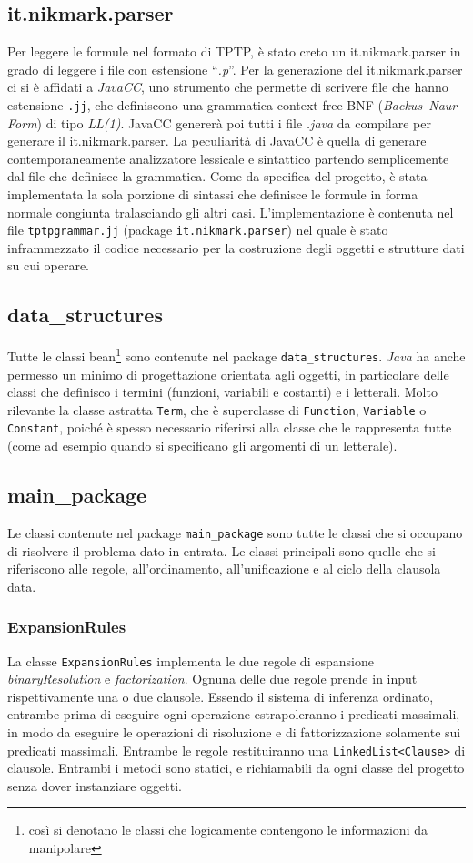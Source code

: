 \documentclass[a4paper,11pt]{article}
\begin{document}
\subsection{it.nikmark.parser}
Per leggere le formule nel formato di TPTP, è stato creto un it.nikmark.parser in grado di leggere i file con estensione ``\emph{.p}''. Per la generazione del it.nikmark.parser ci si è affidati a \emph{JavaCC}\cite{JavaCC}, uno strumento che permette di scrivere file che hanno estensione \texttt{.jj}, che definiscono una grammatica context-free BNF (\emph{Backus–Naur Form}) di tipo \emph{LL(1)}. JavaCC genererà poi tutti i file \emph{.java} da compilare per generare il it.nikmark.parser. La peculiarità di JavaCC è quella di generare contemporaneamente analizzatore lessicale e sintattico partendo semplicemente dal file che definisce la grammatica. Come da specifica del progetto, è stata implementata la sola porzione di sintassi che definisce le formule in forma normale congiunta tralasciando gli altri casi.
L’implementazione è contenuta nel file {\tt tptpgrammar.jj} (package {\tt it.nikmark.parser}) nel quale è stato inframmezzato il codice necessario per la costruzione degli oggetti e strutture dati su cui operare.

\subsection{data\_structures}
Tutte le classi bean\footnote{così si denotano le classi che logicamente contengono le informazioni da manipolare} sono contenute nel package {\tt data\_structures}. \emph{Java} ha anche permesso un minimo di progettazione orientata agli oggetti, in particolare delle classi che definisco i termini (funzioni, variabili e costanti) e i letterali. 
Molto rilevante la classe astratta \texttt{Term}, che è superclasse di \texttt{Function}, \texttt{Variable} o \texttt{Constant}, poiché è spesso necessario riferirsi alla classe che le rappresenta tutte (come ad esempio quando si specificano gli argomenti di un letterale). \par
\subsection{main\_package}
Le classi contenute nel package \texttt{main\_package} sono tutte le classi che si occupano di risolvere il problema dato in entrata. Le classi principali sono quelle che si riferiscono alle regole, all'ordinamento, all'unificazione e al ciclo della clausola data.
\subsubsection{ExpansionRules}
La classe \texttt{ExpansionRules} implementa le due regole di espansione \emph{binaryResolution} e \emph{factorization}. Ognuna delle due regole prende in input rispettivamente una o due clausole. Essendo il sistema di inferenza ordinato, entrambe prima di eseguire ogni operazione estrapoleranno i predicati massimali, in modo da eseguire le operazioni di risoluzione e di fattorizzazione solamente sui predicati massimali. Entrambe le regole restituiranno una \texttt{LinkedList<Clause>} di clausole. Entrambi i metodi sono statici, e richiamabili da ogni classe del progetto senza dover instanziare oggetti.
\end{document}
